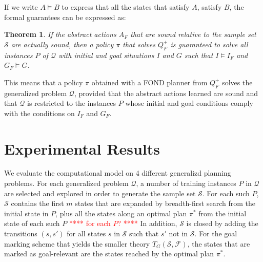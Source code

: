 \documentclass[letterpaper]{article} %
\newcommand{\Omit}[1]{}
\newtheorem{theorem}[definition]{Theorem}
\newcommand{\Q}{\mathcal{Q}}
\newcommand{\F}{\mathcal{F}}
\renewcommand{\S}{\mathcal{S}}
\begin{document}
If we write $A \vDash B$ to express that all the states that satisfy $A$, satisfy $B$, 
the formal guarantees can be expressed as:

\begin{theorem}
If the abstract actions $A_F$ that are sound relative to the sample set $\S$  are actually sound,
then a   policy $\pi$ that solves  $Q^+_F$  is guaranteed to solve  all instances $P$ of $\Q$
with initial and goal situations $I$ and $G$ such that $I \vDash  I_F$ and $G_F \vDash G$.
\end{theorem}

This means that a policy $\pi$ obtained with a FOND planner from $Q^+_F$ 
solves the generalized problem $\Q$, provided that the abstract actions
learned are sound and that $\Q$ is restricted to the instances $P$ whose
initial and goal conditions comply with the conditions on $I_F$ and $G_F$.
\Omit{
Since we do not use a language for specifying $\Q$ formally, we will 
take the formulas $I_F$ and $G_F$  as a partial formal specification of
$\Q$. The theorem then says that if soundness over the samples, ensure
formal soundness over $\Q$, the policy that solves the FONDP $Q^+_F$,
solves $\Q$. The result holds whether $T$ or $T_G$ (goal marking) is used in step 3.
In principle, we could learn the formulas $I_F$ and $G_F$ from the sample as well,  but with different guarantees. 
}


\section{Experimental Results}

We evaluate the computational model on 4 different generalizd planning problems.
%
For each generalized problem $\Q$, a number of training instances $P$ in $\Q$
are selected and explored in order to generate the sample set $\S$. %
For each such $P$, $\S$ contains the first $m$ states that are expanded by
breadth-first search from the initial state in $P$, plus all the states along
an optimal plan $\pi^*$ from the initial state of each such $P$ \textcolor{red}{**** for each $P$? ****}
In addition, $\S$ is closed by adding the transitions $(s,s')$ for all states
$s$ in $\S$ such that $s'$ not in $\S$.
For the goal marking scheme that yields the smaller theory $T_G(\S, \F)$,
the states that are marked as goal-relevant are the states reached by
the optimal plan $\pi^*$.
\end{document}
